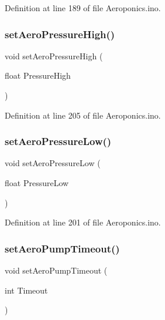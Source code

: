 Definition at line 189 of file Aeroponics.\+ino.

\mbox{\label{_aeroponics_8ino_a1193a6a23d0e754645ed16bc2bd8b8ca}} 
\subsubsection{\texorpdfstring{setAeroPressureHigh()}{setAeroPressureHigh()}}
{\footnotesize\ttfamily void set\+Aero\+Pressure\+High (\begin{DoxyParamCaption}\item[{float}]{Pressure\+High }\end{DoxyParamCaption})}



Definition at line 205 of file Aeroponics.\+ino.

\mbox{\label{_aeroponics_8ino_aaa624d869d52ed407c5a31a9131b8a39}} 
\subsubsection{\texorpdfstring{setAeroPressureLow()}{setAeroPressureLow()}}
{\footnotesize\ttfamily void set\+Aero\+Pressure\+Low (\begin{DoxyParamCaption}\item[{float}]{Pressure\+Low }\end{DoxyParamCaption})}



Definition at line 201 of file Aeroponics.\+ino.

\mbox{\label{_aeroponics_8ino_a3e14ba4db1e3a91a8703e58d3d3ddbaf}} 
\subsubsection{\texorpdfstring{setAeroPumpTimeout()}{setAeroPumpTimeout()}}
{\footnotesize\ttfamily void set\+Aero\+Pump\+Timeout (\begin{DoxyParamCaption}\item[{int}]{Timeout }\end{DoxyParamCaption})}



